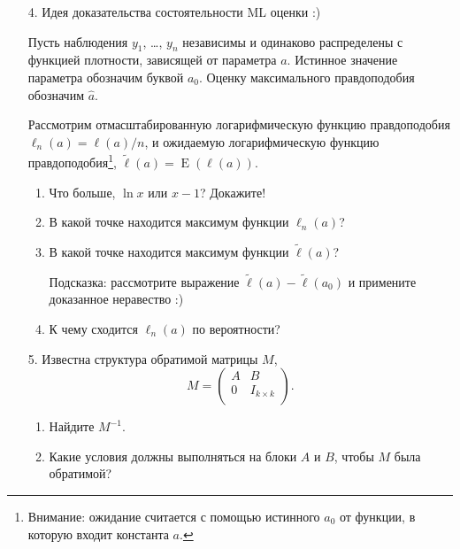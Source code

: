 \documentclass[12pt]{article}
\DeclareMathOperator{\E}{E}
\begin{document}
\begin{enumerate}[resume]
  \item[4.] Идея доказательства состоятельности ML оценки :)
    
    Пусть наблюдения $y_1$, \ldots, $y_n$ независимы и одинаково распределены с функцией плотности, зависящей от параметра $a$.
    Истинное значение параметра обозначим буквой $a_0$. Оценку максимального правдоподобия обозначим $\hat a$.

    Рассмотрим отмасштабированную логарифмическую функцию правдоподобия $\ell_n(a)=\ell(a) / n$, и
    ожидаемую логарифмическую функцию правдоподобия\footnote{Внимание: 
    ожидание считается с помощью истинного $a_0$ от функции, в которую входит константа $a$.}, 
    $\tilde \ell(a)=\E(\ell(a))$.
    \begin{enumerate}
      \item Что больше, $\ln x$ или $x-1$? Докажите!
      \item В какой точке находится максимум функции $\ell_n(a)$?        
      \item В какой точке находится максимум функции $\tilde \ell(a)$?
 
	Подсказка: рассмотрите выражение $\tilde \ell(a) - \tilde \ell(a_0)$ и примените доказанное неравество :)
      \item К чему сходится $\ell_n(a)$ по вероятности?

    \end{enumerate}


  \item[5.] Известна структура обратимой матрицы $M$,
    \[
         M = \begin{pmatrix}
	   A & B \\
	   0 & I_{k\times k} \\
	 \end{pmatrix}.
    \]

    \begin{enumerate}
      \item Найдите $M^{-1}$.
      \item Какие условия должны выполняться на блоки $A$ и $B$, чтобы $M$ была обратимой?
    \end{enumerate}


\end{enumerate}
\end{document}
